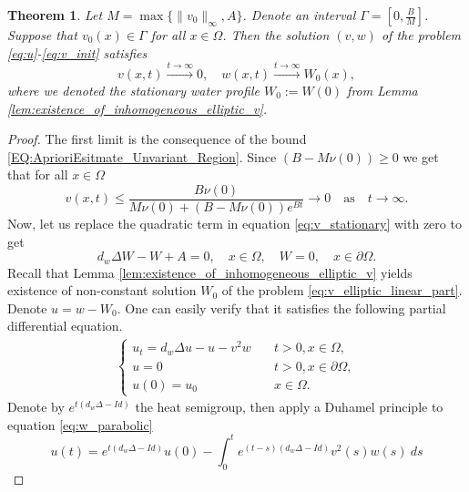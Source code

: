 \documentclass[11pt, a4paper]{article}
\theoremstyle{break}
\newtheorem{thm}{Theorem}[section]
\theoremstyle{break}
\theoremstyle{break}
\theoremstyle{break}
\theoremstyle{break}
\theoremstyle{break}
\theoremstyle{break}
\theoremstyle{break}
\theoremstyle{break}
\begin{document}
\begin{thm}
    \label{thm:Exinction-Of-Vegetation}
    Let $M = \max\{\|v_0\|_\infty, A\}$. Denote an interval $\Gamma  = \left[0, \frac{B}{M}\right]$. Suppose that $v_0(x) \in \Gamma$ for all $x \in \Omega$. Then the solution $(v, w)$ of the problem \eqref{eq:u}-\eqref{eq:v_init} satisfies
    \begin{equation}
        v(x,t) \xrightarrow{t \rightarrow \infty} 0, \quad w(x,t) \xrightarrow{t \rightarrow \infty} W_0(x),
    \end{equation}
    where we denoted the stationary water profile $W_0 := W(0)$ from  Lemma \ref{lem:existence_of_inhomogeneous_elliptic_v}.
\end{thm}
\begin{proof}
    The first limit is the consequence of the bound \eqref{EQ:AprioriEsitmate_Unvariant_Region}. Since $(B - M\nu(0)) \geq 0$ we get that for all $x \in \Omega$
    \begin{equation*}
        v(x,t) \leq \frac{B\nu(0)}{M \nu(0) + 
        (B - M \nu(0)) e^{B t}} \rightarrow 0 \quad \text{as} \quad t \rightarrow \infty.
    \end{equation*}
    Now, let us replace the quadratic term in equation \eqref{eq:v_stationary} with zero to get
    \begin{equation}
        \label{eq:v_elliptic_linear_part}
        d_w \Delta W - W + A = 0, \quad x \in \Omega, \quad W = 0, \quad x \in \partial \Omega.
    \end{equation}
    Recall that Lemma \ref{lem:existence_of_inhomogeneous_elliptic_v} yields existence of non-constant solution $W_0$ of the problem \eqref{eq:v_elliptic_linear_part}. Denote $u = w - W_0$. One can easily verify that it satisfies the following partial differential equation.
    \begin{align}
        \label{eq:w_parabolic}
        \begin{cases}
            u_t = d_w\Delta u - u - v^2w &\quad t > 0, x \in \Omega, \\
            u = 0 &\quad t > 0, x \in \partial\Omega, \\
            u(0) = u_0 &\quad x \in \Omega.
        \end{cases}
    \end{align}
    Denote by $e^{t(d_w\Delta - Id)}$ the heat semigroup, then apply a Duhamel principle to equation \eqref{eq:w_parabolic}
    \begin{equation}
        \label{eq:w_duhmel_principle}
        u(t) = e^{t(d_w\Delta - Id)} u(0) - \int_0^t e^{(t-s)(d_w\Delta - Id)} v^2(s) w(s)\:ds

\end{equation}
\end{proof}
\end{document}
